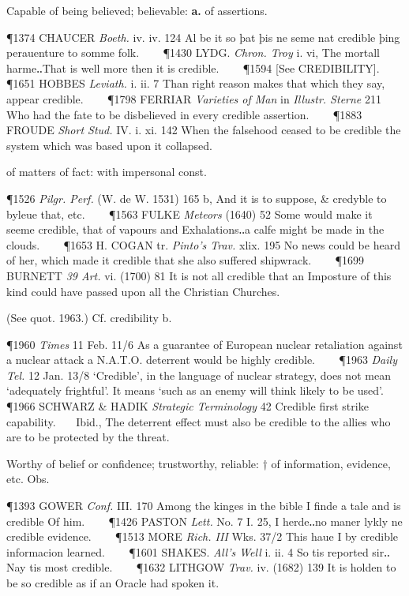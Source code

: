\begin{description}[wide, labelwidth=!, labelindent=0pt]
\begin{myenumerate}

 Capable of being believed; believable: \textbf{a.} of assertions.

\P 1374 CHAUCER  \textit{Boeth.} iv. iv. 124 Al be it so þat þis ne seme nat credible þing perauenture to somme folk.    
\P 1430 LYDG.  \textit{Chron. Troy} i. vi, The mortall harme‥That is well more then it is credible.    
\P 1594 [See CREDIBILITY].    
\P 1651 HOBBES  \textit{Leviath.} i. ii. 7 Than right reason makes that which they say, appear credible.    
\P 1798 FERRIAR  \textit{Varieties of Man} in \textit{Illustr. Sterne} 211 Who had the fate to be disbelieved in every credible assertion.    
\P 1883 FROUDE  \textit{Short Stud.} IV. i. xi. 142 When the falsehood ceased to be credible the system which was based upon it collapsed.

 of matters of fact: with impersonal const.

\P 1526  \textit{Pilgr. Perf.} (W. de W. 1531) 165 b, And it is to suppose, \& credyble to byleue that, etc.    
\P 1563 FULKE  \textit{Meteors} (1640) 52 Some would make it seeme credible, that of vapours and Exhalations‥a calfe might be made in the clouds.    
\P 1653 H. COGAN  tr. \textit{Pinto's Trav.} xlix. 195 No news could be heard of her, which made it credible that she also suffered shipwrack.    
\P 1699 BURNETT  \textit{39 Art.} vi. (1700) 81 It is not all credible that an Imposture of this kind could have passed upon all the Christian Churches.

 (See quot. 1963.) Cf. credibility b.

\P 1960  \textit{Times} 11 Feb. 11/6 As a guarantee of European nuclear retaliation against a nuclear attack a N.A.T.O. deterrent would be highly credible.    
\P 1963  \textit{Daily Tel.} 12 Jan. 13/8 ‘Credible’, in the language of nuclear strategy, does not mean ‘adequately frightful’. It means ‘such as an enemy will think likely to be used’.    
\P 1966 SCHWARZ \& HADIK  \textit{Strategic Terminology} 42 Credible first strike capability.    Ibid., The deterrent effect must also be credible to the allies who are to be protected by the threat.

 Worthy of belief or confidence; trustworthy, reliable: † of information, evidence, etc. Obs.

\P 1393 GOWER  \textit{Conf.} III. 170 Among the kinges in the bible I finde a tale and is credible Of him.    
\P 1426 PASTON  \textit{Lett.} No. 7 I. 25, I herde‥no maner lykly ne credible evidence.    
\P 1513 MORE  \textit{Rich. III} Wks. 37/2 This haue I by credible informacion learned.    
\P 1601 SHAKES.  \textit{All's Well} i. ii. 4 So tis reported sir‥Nay tis most credible.    
\P 1632 LITHGOW  \textit{Trav.} iv. (1682) 139 It is holden to be so credible as if an Oracle had spoken it.


\end{myenumerate}
\end{description}
